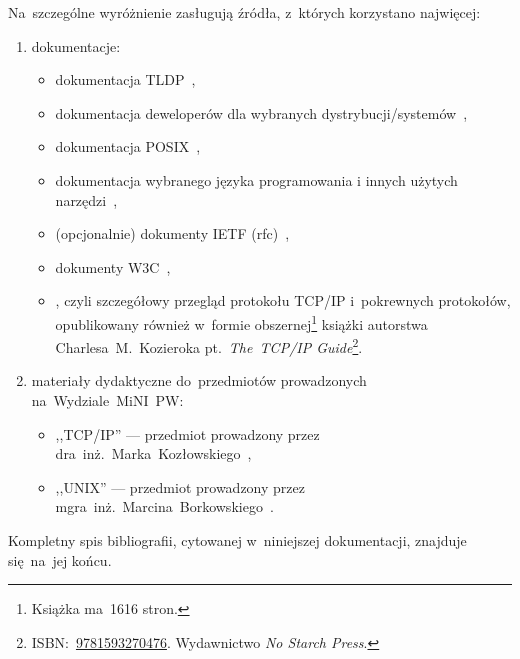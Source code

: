 \documentclass[thesis]{subfiles}
\begin{document}
\noindent Na~szczególne wyróżnienie zasługują źródła, z~których korzystano najwięcej:
\begin{enumerate}
	\item dokumentacje:
	\begin{itemize}
		\item dokumentacja TLDP~\cite{tldp},
		\item dokumentacja deweloperów dla wybranych dystrybucji/systemów~\cite{archlinux-wiki,gentoo-wiki},
		\item dokumentacja POSIX~\cite{posix},
		\item dokumentacja wybranego języka programowania i innych użytych narzędzi~\cite{glibc-doc},
		\item (opcjonalnie) dokumenty IETF (\gls{rfc})~\cite{rfc-editor},
		\item dokumenty W3C~\cite{w3c},
		\item {}, czyli szczegółowy przegląd protokołu TCP/IP i~pokrewnych protokołów, opublikowany również w~formie obszernej\footnote{Książka ma~1616 stron.} książki autorstwa \mbox{Charlesa~M.~Kozieroka} pt.~\textit{The~TCP/IP Guide}\footnote{ISBN:~\href{https://www.nostarch.com/tcpip.htm}{9781593270476}. Wydawnictwo \emph{No Starch Press}.}.
	\end{itemize}
	\item materiały dydaktyczne do~przedmiotów prowadzonych na~Wydziale~MiNI~PW:
	\begin{itemize}
		\item ,,TCP/IP'' --- przedmiot prowadzony przez dra~inż.~Marka~Kozłowskiego~\cite{kozlowski},
		\item ,,UNIX'' --- przedmiot prowadzony przez mgra~inż.~Marcina~Borkowskiego~\cite{borkowski}.
	\end{itemize}
\end{enumerate}
Kompletny spis bibliografii, cytowanej w~niniejszej dokumentacji, znajduje się~na~jej końcu.

\newpage
\end{document}
